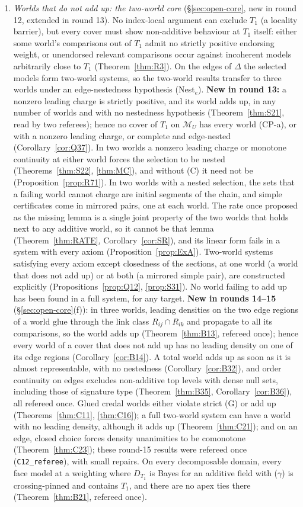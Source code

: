 \documentclass[11pt]{article}
\theoremstyle{definition}
\theoremstyle{remark}
\newcommand{\M}{\mathcal M}
\newcommand{\src}[1]{\texttt{#1}}
\begin{document}
\begin{enumerate}[leftmargin=*]
\item \emph{Worlds that do not add up: the two-world core} (\S\ref{sec:open-core}, new in round 12, extended in round 13). No index-local argument can exclude $T_1$ (a locality barrier), but every cover must show non-additive behaviour at $T_1$ itself: either some world's comparisons out of $T_1$ admit no strictly positive endorsing weight, or unendorsed relevant comparisons occur against incoherent models arbitrarily close to $T_1$ (Theorem~\ref{thm:R3}). On the edges of $\Delta$ the selected models form two-world systems, so the two-world results transfer to three worlds under an edge-nestedness hypothesis (Nest$_e$). \textbf{New in round 13:} a nonzero leading charge is strictly positive, and its world adds up, in any number of worlds and with no nestedness hypothesis (Theorem~\ref{thm:S21}, read by two referees); hence no cover of $T_1$ on $\M_U$ has every world (CP-a), or with a nonzero leading charge, or complete and edge-nested (Corollary~\ref{cor:Q37}). In two worlds a nonzero leading charge or monotone continuity at either world forces the selection to be nested (Theorems~\ref{thm:S22}, \ref{thm:MC}), and without (C) it need not be (Proposition~\ref{prop:R71}). In two worlds with a nested selection, the sets that a failing world cannot charge are initial segments of the chain, and simple certificates come in mirrored pairs, one at each world. The rate once proposed as the missing lemma is a single joint property of the two worlds that holds next to any additive world, so it cannot be that lemma (Theorem~\ref{thm:RATE}, Corollary~\ref{cor:SR}), and its linear form fails in a system with every axiom (Proposition~\ref{prop:ExA}). Two-world systems satisfying every axiom except closedness of the sections, at one world (a world that does not add up) or at both (a mirrored simple pair), are constructed explicitly (Propositions~\ref{prop:Q12}, \ref{prop:S31}). No world failing to add up has been found in a full system, for any target. \textbf{New in rounds 14--15} (\S\ref{sec:open-core}(f)): in three worlds, leading densities on the two edge regions of a world glue through the link class $R_{ij}\cap R_{ik}$ and propagate to all its comparisons, so the world adds up (Theorem~\ref{thm:B13}, refereed once); hence every world of a cover that does not add up has no leading density on one of its edge regions (Corollary~\ref{cor:B14}). A total world adds up as soon as it is almost representable, with no nestedness (Corollary~\ref{cor:B32}), and order continuity on edges excludes non-additive top levels with dense null sets, including those of signature type (Theorem~\ref{thm:B35}, Corollary~\ref{cor:B36}), all refereed once. Glued credal worlds either violate strict (G) or add up (Theorems~\ref{thm:C11}, \ref{thm:C16}); a full two-world system can have a world with no leading density, although it adds up (Theorem~\ref{thm:C21}); and on an edge, closed choice forces density unanimities to be comonotone (Theorem~\ref{thm:C23}); these round-15 results were refereed once (\src{C12\_referee}), with small repairs. On every decomposable domain, every face model at a weighting where $D_{T_1}$ is Bayes for an additive field with ($\gamma$) is crossing-pinned and contains $T_1$, and there are no apex ties there (Theorem~\ref{thm:B21}, refereed once).

\end{enumerate}
\end{document}
